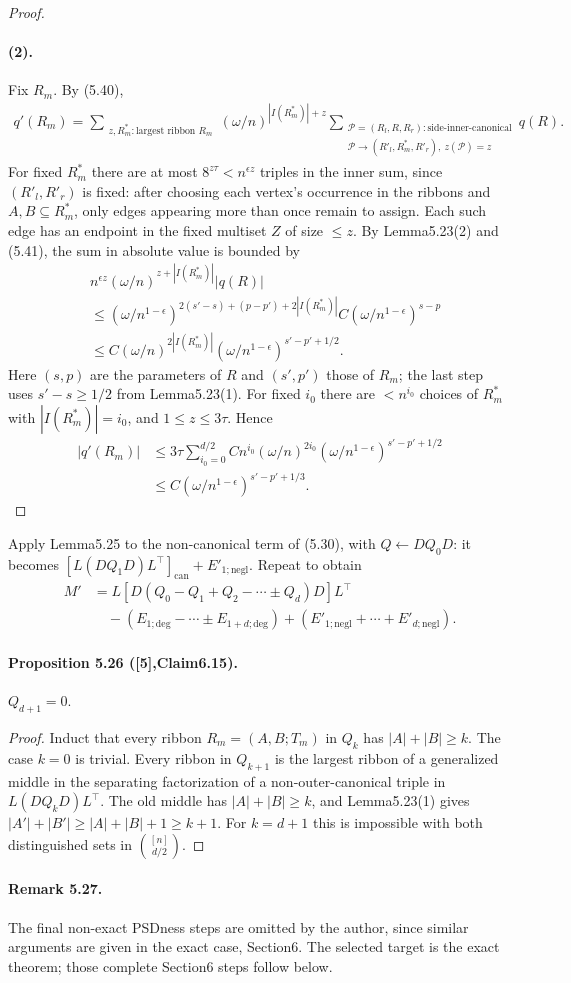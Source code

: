 \begin{proof}
\paragraph{(2).} Fix $R_m$. By (5.40),
\begin{align*}q'(R_m)=\sum_{\substack{z,R^*_m:\text{largest ribbon }R_m}}(\omega/n)^{|I(R^*_m)|+z}\sum_{\substack{\mathcal P=(R_l,R,R_r):\text{side-inner-canonical}\\\mathcal P\to(R'_l,R^*_m,R'_r),\ z(\mathcal P)=z}}q(R).
\end{align*}
For fixed $R^*_m$ there are at most $8^{z\tau}<n^{\epsilon z}$ triples in the inner sum, since $(R'_l,R'_r)$ is fixed: after choosing each vertex's occurrence in the ribbons and $A,B\subseteq R^*_m$, only edges appearing more than once remain to assign. Each such edge has an endpoint in the fixed multiset $Z$ of size $\le z$. By Lemma5.23(2) and (5.41), the sum in absolute value is bounded by
\begin{align*}&n^{\epsilon z}(\omega/n)^{z+|I(R^*_m)|}|q(R)|\\&\le(\omega/n^{1-\epsilon})^{2(s'-s)+(p-p')+2|I(R^*_m)|}C(\omega/n^{1-\epsilon})^{s-p}\\&\le C(\omega/n)^{2|I(R^*_m)|}(\omega/n^{1-\epsilon})^{s'-p'+1/2}.\end{align*}
Here $(s,p)$ are the parameters of $R$ and $(s',p')$ those of $R_m$; the last step uses $s'-s\ge1/2$ from Lemma5.23(1). For fixed $i_0$ there are $<n^{i_0}$ choices of $R^*_m$ with $|I(R^*_m)|=i_0$, and $1\le z\le3\tau$. Hence
\begin{align*}|q'(R_m)|&\le3\tau\sum_{i_0=0}^{d/2}Cn^{i_0}(\omega/n)^{2i_0}(\omega/n^{1-\epsilon})^{s'-p'+1/2}\\&\le C(\omega/n^{1-\epsilon})^{s'-p'+1/3}.\end{align*}\end{proof}
Apply Lemma5.25 to the non-canonical term of (5.30), with $Q\leftarrow DQ_0D$: it becomes $[L(DQ_1D)L^\top]_{\mathrm{can}}+E'_{1;\mathrm{negl}}$. Repeat to obtain
\begin{align*}M'&=L[D(Q_0-Q_1+Q_2-\cdots\pm Q_d)D]L^\top\\&\quad-(E_{1;\mathrm{deg}}-\cdots\pm E_{1+d;\mathrm{deg}})+(E'_{1;\mathrm{negl}}+\cdots+E'_{d;\mathrm{negl}}).\tag{5.45}\end{align*}
\paragraph{Proposition 5.26 ([5],Claim6.15).} $Q_{d+1}=0$.
\begin{proof}Induct that every ribbon $R_m=(A,B;T_m)$ in $Q_k$ has $|A|+|B|\ge k$. The case $k=0$ is trivial. Every ribbon in $Q_{k+1}$ is the largest ribbon of a generalized middle in the separating factorization of a non-outer-canonical triple in $L(DQ_kD)L^\top$. The old middle has $|A|+|B|\ge k$, and Lemma5.23(1) gives $|A'|+|B'|\ge|A|+|B|+1\ge k+1$. For $k=d+1$ this is impossible with both distinguished sets in $\binom{[n]}{d/2}$.\end{proof}
\paragraph{Remark 5.27.} The final non-exact PSDness steps are omitted by the author, since similar arguments are given in the exact case, Section6. The selected target is the exact theorem; those complete Section6 steps follow below.
